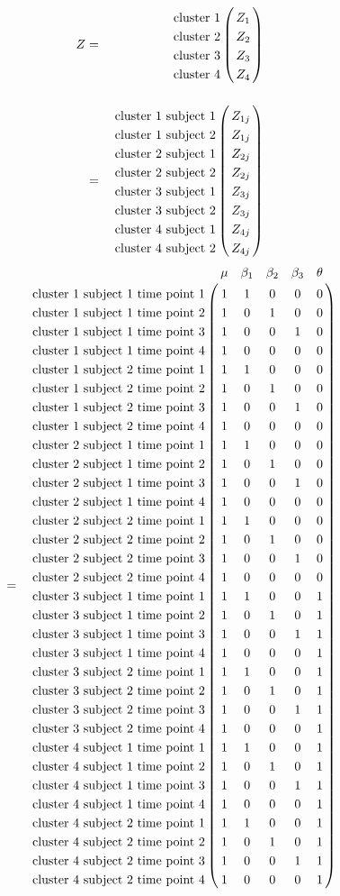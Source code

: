\documentclass{article}
\begin{document}
\begin{eqnarray*}
Z&=&\bordermatrix{
  					& \cr
\textrm{cluster 1} 	& Z_{1}\cr
\textrm{cluster 2}	&Z_{2} 		\cr
\textrm{cluster 3}  &Z_{3} 		\cr
\textrm{cluster 4}  &Z_{4}   	\cr
}\\
&=&\bordermatrix{
  					& \cr
\textrm{cluster 1 subject 1} 	& Z_{1j}\cr
\textrm{cluster 1 subject 2}	&Z_{1j} 		\cr
\textrm{cluster 2 subject 1} 	& Z_{2j}\cr
\textrm{cluster 2 subject 2}	&Z_{2j} 		\cr
\textrm{cluster 3 subject 1}   & Z_{3j}\cr
\textrm{cluster 3 subject 2}	&Z_{3j} 		\cr
\textrm{cluster 4 subject 1}   & Z_{4j}\cr
\textrm{cluster 4 subject 2}  &Z_{4j} 		\cr
}
\end{eqnarray*}
\begin{eqnarray*}
&=&  \bordermatrix{
    					& \mu	&\beta_{1}	& \beta_{2}	& \beta_{3}&\theta\cr
\textrm{cluster 1 subject 1 time point 1} 	& 1		&1			&0		 	& 0 & 0\cr
\textrm{cluster 1 subject 1 time point 2} 	&1 		&0 			&1			& 0 & 0\cr
\textrm{cluster 1 subject 1 time point 3}	&1 		&0			&0			& 1& 0\cr
\textrm{cluster 1 subject 1 time point 4}  &1 		&0			&0		&0	& 0\cr
\textrm{cluster 1 subject 2 time point 1} 	& 1		&1			&0		&0 	& 0\cr
\textrm{cluster 1 subject 2 time point 2} 	&1 		&0 			&1		&0	& 0\cr
\textrm{cluster 1 subject 2 time point 3}	&1 		&0			&0			& 1& 0\cr
\textrm{cluster 1 subject 2 time point 4}  &1 		&0			&0		&0	& 0\cr
\textrm{cluster 2 subject 1 time point 1} 	& 1		&1			&0		 	& 0& 0\cr
\textrm{cluster 2 subject 1 time point 2} 	&1 		&0 			&1			& 0& 0\cr
\textrm{cluster 2 subject 1 time point 3}	&1 		&0			&0		& 1	& 0\cr
\textrm{cluster 2 subject 1 time point 4}  &1 		&0			&0		& 0	& 0\cr
\textrm{cluster 2 subject 2 time point 1} 	& 1		&1			&0		 	& 0& 0\cr
\textrm{cluster 2 subject 2 time point 2} 	&1 		&0 			&1			& 0& 0\cr
\textrm{cluster 2 subject 2 time point 3}	&1 		&0			&0			& 1& 0\cr
\textrm{cluster 2 subject 2 time point 4}  &1 		&0			&0		& 0	& 0\cr
\textrm{cluster 3 subject 1 time point 1}   & 1		&1			&0		 	& 0& 1\cr
\textrm{cluster 3 subject 1 time point 2} 	&1 		&0 			&1			& 0& 1\cr
\textrm{cluster 3 subject 1 time point 3}	&1 		&0			&0		& 1	& 1\cr
\textrm{cluster 3 subject 1 time point 4}  &1 		&0			&0		& 0	& 1\cr
\textrm{cluster 3 subject 2 time point 1} 	& 1		&1			&0		 	& 0& 1\cr
\textrm{cluster 3 subject 2 time point 2} 	&1 		&0 			&1			& 0& 1\cr
\textrm{cluster 3 subject 2 time point 3}	&1 		&0			&0			& 1& 1\cr
\textrm{cluster 3 subject 2 time point 4}  &1 		&0			&0		& 0	& 1\cr
\textrm{cluster 4 subject 1 time point 1}   & 1  	&1			&0		 	& 0& 1\cr
\textrm{cluster 4 subject 1 time point 2} 	&1 		&0 			&1			& 0& 1\cr
\textrm{cluster 4 subject 1 time point 3}	&1 		&0			&0		& 1	& 1\cr
\textrm{cluster 4 subject 1 time point 4}  &1 		&0			&0		& 0	& 1\cr
\textrm{cluster 4 subject 2 time point 1} 	& 1		&1			&0		 	& 0& 1\cr
\textrm{cluster 4 subject 2 time point 2} 	&1 		&0 			&1			& 0& 1\cr
\textrm{cluster 4 subject 2 time point 3}	&1 		&0			&0			& 1& 1\cr
\textrm{cluster 4 subject 2 time point 4}  &1 		&0			&0		& 0	& 1\cr
}
\end{eqnarray*}
\end{document}
